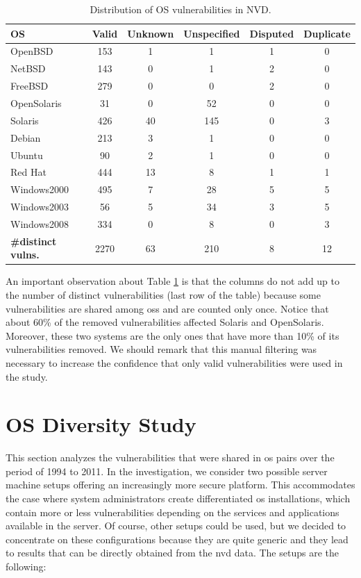 \begin{table}[!ht]
\begin{center}
{\scriptsize
\begin{tabular}{|l||c | c | c | c | c|}\hline
\textbf{OS} & \textbf{Valid} & \textbf{Unknown} & \textbf{Unspecified} & \textbf{Disputed} & \textbf{Duplicate}  \\\hline\hline %
OpenBSD & 153 & 1 & 1 & 1 & 0 \\
NetBSD & 143 & 0 & 1 & 2 & 0  \\
FreeBSD & 279 & 0 & 0 & 2 & 0 \\
OpenSolaris & 31 & 0 & 52 & 0 & 0  \\
Solaris & 426 & 40 & 145 & 0 & 3  \\
Debian & 213 & 3 & 1 & 0 & 0  \\
Ubuntu & 90 & 2 & 1 & 0 & 0  \\
Red Hat & 444 & 13 & 8 & 1 & 1  \\
Windows2000 & 495 & 7 & 28 & 5 & 5  \\
Windows2003 & 56 & 5 & 34 & 3 & 5  \\
Windows2008 & 334 & 0 & 8 & 0 & 3   \\\hline\hline
\textbf{\#distinct vulns.} & 2270 & 63 & 210 & 8 & 12 \\ \hline
\end{tabular}
\caption{Distribution of OS vulnerabilities in NVD.}
\label{tab:unknowns}
}
\end{center}
\end{table}

An important observation about Table \ref{tab:unknowns} is that the columns do not add up to the number of distinct vulnerabilities (last row of the table) because some vulnerabilities are shared among \glspl{os} and are counted only once.
Notice that about 60\% of the removed vulnerabilities affected Solaris and OpenSolaris.
Moreover, these two systems are the only ones that have more than 10\% of its vulnerabilities removed.
We should remark that this manual filtering was necessary to increase the confidence that only valid vulnerabilities were used in the study.


\section{OS Diversity Study}\label{study}
This section analyzes the vulnerabilities that were shared in \gls{os} pairs over the period of 1994 to 2011. 
In the investigation, we consider two possible server machine setups offering an increasingly more secure platform. 
This accommodates the case where system administrators create differentiated \gls{os} installations, which contain more or less vulnerabilities depending on the services and applications available in the server. 
Of course, other setups could be used, but we decided to concentrate on these configurations because they are quite generic and they lead to results that can be directly obtained from the \gls{nvd} data. 
The setups are the following:

